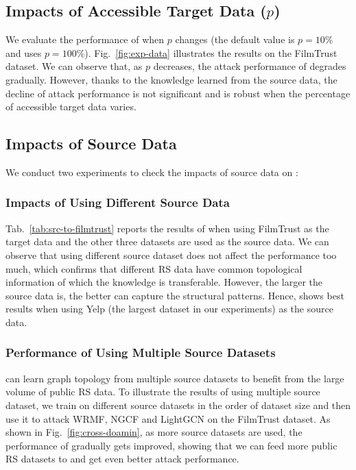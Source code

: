 \subsection{Impacts of Accessible Target Data ($p$)}


We evaluate the performance of \ours when $p$ changes (the default value is $p=10\%$ and \oursstar uses $p=100\%$). 
Fig.~\ref{fig:exp-data} illustrates the results on the FilmTrust dataset.
We can observe that, as $p$ decreases, the attack performance of \ours degrades gradually.
However, thanks to the knowledge learned from the source data, the decline of attack performance is not significant and \ours is robust when the percentage of accessible target data varies.



\subsection{Impacts of Source Data} 


We conduct two experiments to check the impacts of source data on \ours:


\subsubsection{Impacts of Using Different Source Data} 
Tab.~\ref{tab:src-to-filmtrust} reports the results of \ours when using FilmTrust as the target data and the other three datasets are used as the source data. 
We can observe that using different source dataset does not affect the performance too much, which confirms that different RS data have common topological information of which the knowledge is transferable. 
However, the larger the source data is, the better \ours can capture the structural patterns. 
Hence, \ours shows best results when using Yelp (the largest dataset in our experiments) as the source data.


\subsubsection{Performance of Using Multiple Source Datasets} 
\ours can learn graph topology from multiple source datasets to benefit from the large volume of public RS data.
To illustrate the results of using multiple source dataset, we train \ours on different source datasets in the order of dataset size and then use it to attack WRMF, NGCF and LightGCN on the FilmTrust dataset.
As shown in Fig.~\ref{fig:cross-doamin}, as more source datasets are used, the performance of \ours gradually gets improved, showing that we can feed more public RS datasets to \ours and get even better attack performance.





